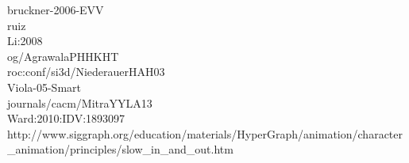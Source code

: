 %
%
%
%
bruckner-2006-EVV\cite{proc:bruckner-2006-EVV}\\
ruiz \cite{proc:ruiz-2008-SEV} \\
Li:2008\cite{proc:Li:2008:AGI} \\
og/AgrawalaPHHKHT\cite{journals/tog/AgrawalaPHHKHT03}\\
roc:conf/si3d/NiederauerHAH03\cite{proc:conf/si3d/NiederauerHAH03}\\
Viola-05-Smart\cite{Viola-05-Smart}\\
journals/cacm/MitraYYLA13\cite{journals/cacm/MitraYYLA13}\\
Ward:2010:IDV:1893097\cite{Ward:2010:IDV:1893097}\\
http://www.siggraph.org/education/materials/HyperGraph/animation/character_animation/principles/slow_in_and_out.htm\cite{misc:siggraph}